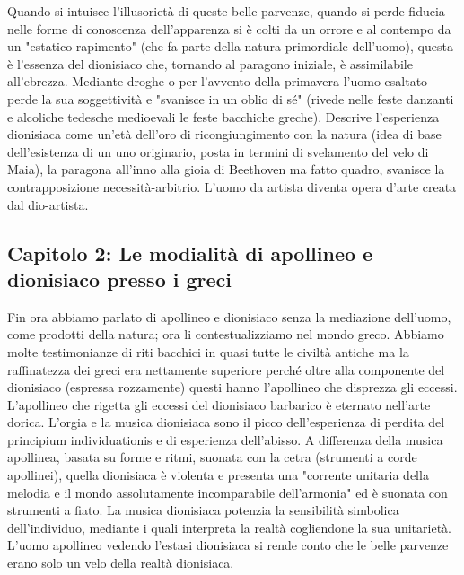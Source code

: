 \documentclass[10pt,a4paper]{article}
\begin{document}
Quando si intuisce l'illusorietà di queste belle parvenze, quando si perde fiducia nelle forme di conoscenza dell'apparenza si è colti da un orrore e al contempo da un "estatico rapimento" (che fa parte della natura primordiale dell'uomo), questa è l'essenza del dionisiaco che, tornando al paragono iniziale, è assimilabile all'ebrezza. Mediante droghe o per l'avvento della primavera l'uomo esaltato perde la sua soggettività e "svanisce in un oblio di sé" (rivede nelle feste danzanti e alcoliche tedesche medioevali le feste bacchiche greche). Descrive l'esperienza dionisiaca come un'età dell'oro di ricongiungimento con la natura (idea di base dell'esistenza di un uno originario, posta in termini di svelamento del velo di Maia), la paragona all'inno alla gioia di Beethoven ma fatto quadro, svanisce la contrapposizione necessità-arbitrio. L'uomo da artista diventa opera d'arte creata dal dio-artista.
\subsection{Capitolo 2: Le modialità di apollineo e dionisiaco presso i greci}
Fin ora abbiamo parlato di apollineo e dionisiaco senza la mediazione dell'uomo, come prodotti della natura; ora li contestualizziamo nel mondo greco. Abbiamo molte testimonianze di riti bacchici in quasi tutte le civiltà antiche ma la raffinatezza dei greci era nettamente superiore perché oltre alla componente del dionisiaco (espressa rozzamente) questi hanno l'apollineo che disprezza gli eccessi. L'apollineo che rigetta gli eccessi del dionisiaco barbarico è eternato nell'arte dorica. L'orgia e la musica dionisiaca sono il picco dell'esperienza di perdita del principium individuationis e di esperienza dell'abisso. A differenza della musica apollinea, basata su forme e ritmi, suonata con la cetra (strumenti a corde apollinei), quella dionisiaca è violenta e presenta una "corrente unitaria della melodia e il mondo assolutamente incomparabile dell'armonia" ed è suonata con strumenti a fiato. La musica dionisiaca potenzia la sensibilità simbolica dell'individuo, mediante i quali interpreta la realtà cogliendone la sua unitarietà. L'uomo apollineo vedendo l'estasi dionisiaca si rende conto che le belle parvenze erano solo un velo della realtà dionisiaca.
\end{document}
